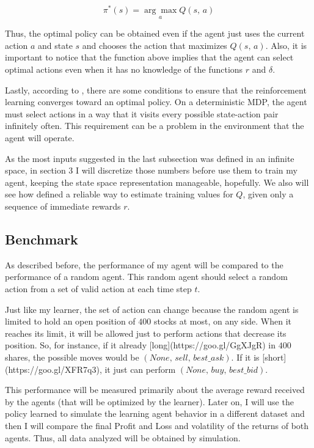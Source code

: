 \documentclass[a4paper]{article}
\begin{document}
$$\pi^{*}(s) = \underset{a}{\arg \max} Q(s, \, a)$$

Thus, the optimal policy can be obtained even if the agent just uses the current action $a$ and state $s$ and chooses the action that maximizes $Q(s,\, a)$. Also, it is important to notice that the function above implies that the agent can select optimal actions even when it has no knowledge of the functions $r$ and $\delta$.

Lastly, according to \cite{Mitchell}, there are some conditions to ensure that the reinforcement learning converges toward an optimal policy. On a deterministic MDP, the agent must select actions in a way that it visits every possible state-action pair infinitely often. This requirement can be a problem in the environment that the agent will operate.

As the most inputs suggested in the last subsection was defined in an infinite space, in section 3 I will discretize those numbers before use them to train my agent, keeping the state space representation manageable, hopefully. We also will see how \cite{Mitchell} defined a reliable way to estimate training values for $Q$, given only a sequence of immediate rewards $r$.

\subsection{Benchmark}
As described before, the performance of my agent will be compared to the performance of a random agent. This random agent should select a random action from a set of valid action at each time step $t$.

Just like my learner, the set of action can change because the random agent is limited to hold an open position of $400$ stocks at most, on any side. When it reaches its limit, it will be allowed just to perform actions that decrease its position. So, for instance, if it already [long](https://goo.gl/GgXJgR) in $400$ shares, the possible moves would be $\left (None,\, sell,\, best\_ask \right)$. If it is [short](https://goo.gl/XFR7q3), it just can perform $\left (None,\, buy,\, best\_bid\right)$.

This performance will be measured primarily about the average reward received by the agents (that will be optimized by the learner). Later on, I will use the policy learned to simulate the learning agent behavior in a different dataset and then I will compare the final Profit and Loss and volatility of the returns of both agents. Thus, all data analyzed will be obtained by simulation.
\end{document}
